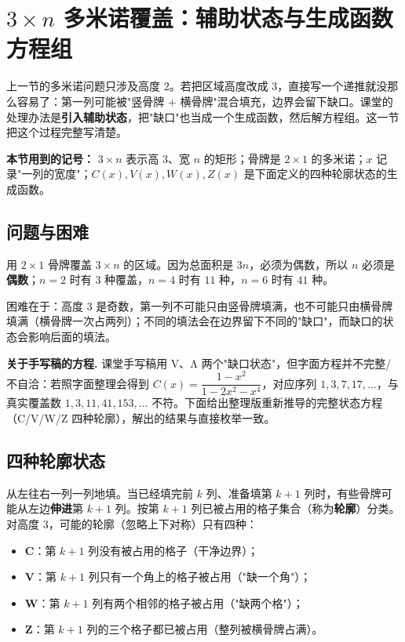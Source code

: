 \section{$3\times n$ 多米诺覆盖：辅助状态与生成函数方程组}


上一节的多米诺问题只涉及高度 $2$。若把区域高度改成 $3$，直接写一个递推就没那么容易了：第一列可能被"竖骨牌 + 横骨牌"混合填充，边界会留下缺口。课堂的处理办法是\textbf{引入辅助状态}，把"缺口"也当成一个生成函数，然后解方程组。这一节把这个过程完整写清楚。

\textbf{本节用到的记号：} $3\times n$ 表示高 $3$、宽 $n$ 的矩形；骨牌是 $2\times1$ 的多米诺；$x$ 记录"一列的宽度"；$C(x),V(x),W(x),Z(x)$ 是下面定义的四种轮廓状态的生成函数。

\subsection{问题与困难}


用 $2\times1$ 骨牌覆盖 $3\times n$ 的区域。因为总面积是 $3n$，必须为偶数，所以 $n$ 必须是\textbf{偶数}；$n=2$ 时有 $3$ 种覆盖，$n=4$ 时有 $11$ 种，$n=6$ 时有 $41$ 种。

困难在于：高度 $3$ 是奇数，第一列不可能只由竖骨牌填满，也不可能只由横骨牌填满（横骨牌一次占两列）；不同的填法会在边界留下不同的"缺口"，而缺口的状态会影响后面的填法。

\textbf{关于手写稿的方程.} 课堂手写稿用 V、Λ 两个"缺口状态"，但字面方程并不完整/不自洽：若照字面整理会得到 $C(x)=\dfrac{1-x^2}{1-2x^2-x^4}$，对应序列 $1,3,7,17,\dots$，与真实覆盖数 $1,3,11,41,153,\dots$ 不符。下面给出整理版重新推导的完整状态方程（C/V/W/Z 四种轮廓），解出的结果与直接枚举一致。

\subsection{四种轮廓状态}


从左往右一列一列地填。当已经填完前 $k$ 列、准备填第 $k+1$ 列时，有些骨牌可能从左边\textbf{伸进}第 $k+1$ 列。按第 $k+1$ 列已被占用的格子集合（称为\textbf{轮廓}）分类。对高度 $3$，可能的轮廓（忽略上下对称）只有四种：

\begin{itemize}
\item \textbf{C}：第 $k+1$ 列没有被占用的格子（干净边界）；
\item \textbf{V}：第 $k+1$ 列只有一个角上的格子被占用（"缺一个角"）；
\item \textbf{W}：第 $k+1$ 列有两个相邻的格子被占用（"缺两个格"）；
\item \textbf{Z}：第 $k+1$ 列的三个格子都已被占用（整列被横骨牌占满）。
\end{itemize}


